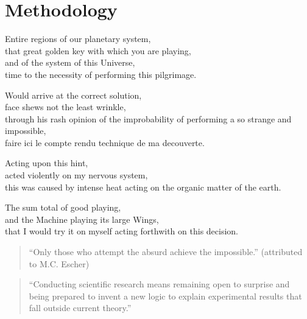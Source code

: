 
\chapter{Methodology}
\label{ch:methodology}

\startcontents[chapters]

\vfill

Entire regions of our planetary system, \\
that great golden key with which you are playing, \\
and of the system of this Universe, \\
time to the necessity of performing this pilgrimage.

Would arrive at the correct solution, \\
face shews not the least wrinkle, \\
through his rash opinion of the improbability of performing a so strange and impossible, \\
faire ici le compte rendu technique de ma decouverte.

Acting upon this hint, \\
acted violently on my nervous system, \\
this was caused by intense heat acting on the organic matter of the earth.

The sum total of good playing, \\
and the Machine playing its large Wings, \\
that I would try it on myself acting forthwith on this decision.

\newpage
\minicontents
\spirals

\begin{quote}
  ``Only those who attempt the absurd achieve the impossible.'' (attributed to M.C. Escher)
\end{quote}


\begin{quote}
  ``Conducting scientific research means remaining open to surprise and being prepared to invent a new logic to explain experimental results that fall outside current theory.'' \autocite{Jarry2006}
\end{quote}

